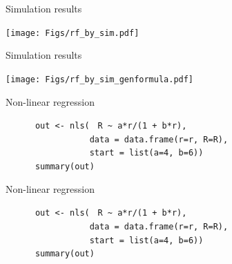 \documentclass[12pt]{article}
\newcommand{\headsize}{\fontsize{35}{35} \selectfont}
\newcommand{\textsize}{\fontsize{30}{35} \selectfont}
\begin{document}
\headsize \color{myyellow}
\hfill \begin{minipage}{5.75in}
\centering
Simulation results
\end{minipage}

\vfill

\centerline{\texttt{[image: Figs/rf\_by\_sim.pdf]}}

\vspace{15mm}

\newpage


\headsize \color{myyellow}
\hfill \begin{minipage}{5.75in}
\centering
Simulation results
\end{minipage}

\vfill

\centerline{\texttt{[image: Figs/rf\_by\_sim\_genformula.pdf]}}

\vspace{15mm}

\newpage

\headsize \color{myyellow}
\hfill \begin{minipage}{5.75in}
\centering
Non-linear regression
\end{minipage}


\vspace{30mm}

\textsize 
{\color{myblue}
\verb|      out <- nls(| {\tt \color{mypink} R \verb|~| a*r/(1 + b*r)}\verb|,| \\
\verb|                 data = data.frame(r=r, R=R),| \\
\verb|                 start = list(a=4, b=6))| \\
\verb|      summary(out)|
}

\newpage
\addtocounter{page}{-1}

\headsize \color{myyellow}
\hfill \begin{minipage}{5.75in}
\centering
Non-linear regression
\end{minipage}


\vspace{30mm}

\textsize 
{\color{myblue}
\verb|      out <- nls(| {\tt \color{mypink} R \verb|~| a*r/(1 + b*r)}\verb|,| \\
\verb|                 data = data.frame(r=r, R=R),| \\
\verb|                 start = list(a=4, b=6))| \\
\verb|      summary(out)|
}
\end{document}
